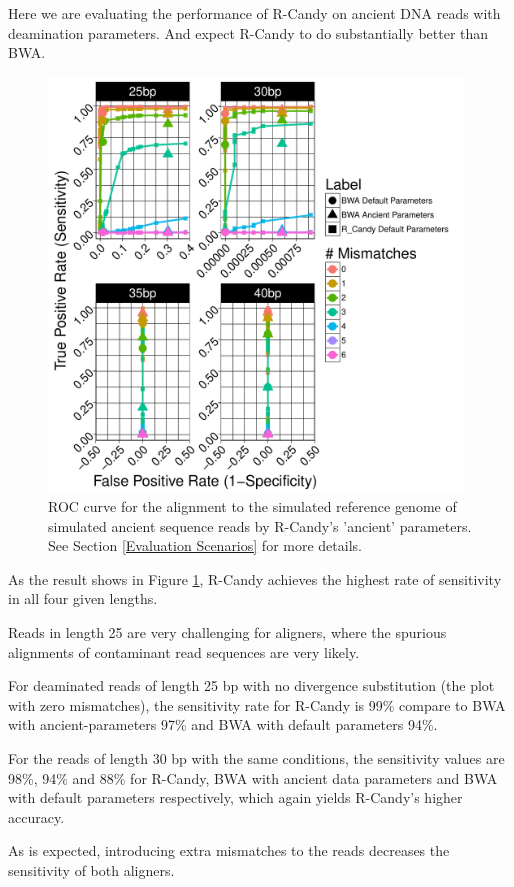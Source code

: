 \documentclass[11pt,a4paper]{report}
\begin{document}
Here we are evaluating the performance of R-Candy on ancient DNA reads with 
deamination parameters. And expect R-Candy to do substantially better than BWA.


\begin{figure}[H]
\centering
\includegraphics[width=11cm]{pictures/f_DS1_emp.pdf}

\caption{
ROC curve for the alignment to the simulated reference genome of simulated ancient
sequence reads by R-Candy's 'ancient' parameters. See Section \ref{Evaluation Scenarios}
for more details.}
\label{DS1_emp}
\end{figure}


As the result shows in Figure \ref{DS1_emp}, R-Candy achieves the highest rate of
sensitivity in all four given lengths.

Reads in length 25 are very challenging for aligners, where the spurious 
alignments of contaminant read sequences are very likely.

For deaminated reads of length 25 bp with no divergence substitution (the plot
with zero mismatches), the sensitivity rate for R-Candy is 99\% compare to BWA 
with ancient-parameters 97\% and BWA with default parameters 94\%. 


For the reads of length 30 bp with the same conditions, the sensitivity values 
are 98\%, 94\% and 88\% for R-Candy, BWA with ancient data parameters and BWA 
with default parameters respectively, which again yields R-Candy's higher accuracy.

As is expected, introducing extra mismatches to the reads decreases  
the sensitivity of both aligners.
\end{document}
